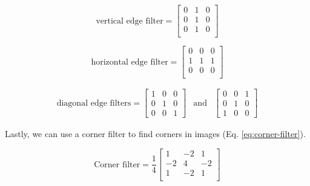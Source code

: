 \begin{equation}
    \text{vertical edge filter} = \begin{bmatrix}
            0 & 1 & 0 \\
            0 & 1 & 0 \\
            0 & 1 & 0 \\
    \end{bmatrix}
    \label{eq:vert-edge-filter}
\end{equation}

\begin{equation}
    \text{horizontal edge filter} =\begin{bmatrix}
        0 & 0 & 0 \\
        1 & 1 & 1 \\
        0 & 0 & 0 \\
    \end{bmatrix}
    \label{eq:horiz-edge-filter}
\end{equation}

\begin{equation}
    \begin{aligned}
        \text{diagonal edge filters} = \begin{bmatrix}
            1 & 0 & 0 \\
            0 & 1 & 0\\
            0 & 0 & 1
        \end{bmatrix}& \text{and} & 
        \begin{bmatrix}
            0 & 0 & 1 \\
            0 & 1 & 0\\
            1 & 0 & 0
        \end{bmatrix}
    \end{aligned}
    \label{eq:diag-edge-filter}
\end{equation}

Lastly, we can use a corner filter to find corners in images (Eq. \ref{eq:corner-filter}).

\begin{equation}
    \text{Corner filter} = \frac{1}{4}\begin{bmatrix}
        1 & -2 & 1 \\
        -2 & 4 & -2 \\
        1 & -2 & 1 \\
    \end{bmatrix}
    \label{eq:corner-filter}
\end{equation}


